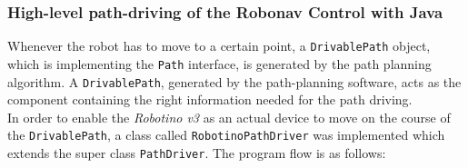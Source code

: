 \subsubsection{High-level path-driving of the Robonav Control with Java}
\label{subsubsec:pathdrivinghighlevel}
Whenever the robot has to move to a certain point, a \texttt{DrivablePath} object, which is implementing the \texttt{Path} interface, is generated by the path planning algorithm. A  \texttt{DrivablePath}, generated by the path-planning software, acts as the component containing the right information needed for the path driving. \\
In order to enable the \textit{Robotino v3} as an actual device to move on the course of the \texttt{DrivablePath}, a class called \texttt{RobotinoPathDriver} was implemented which extends the super class \texttt{PathDriver}.
The program flow is as follows:
